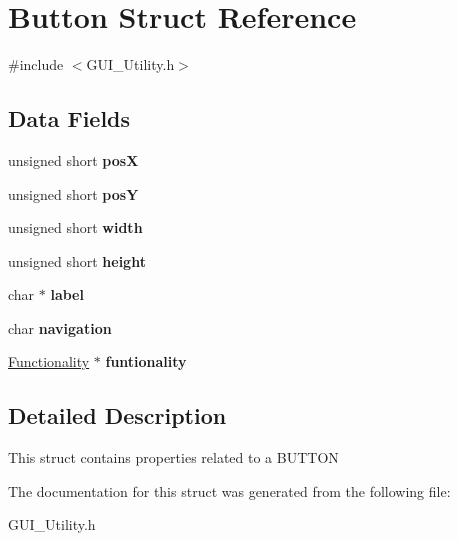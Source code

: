 \hypertarget{struct_button}{}\section{Button Struct Reference}
\label{struct_button}


{\ttfamily \#include $<$G\+U\+I\+\_\+\+Utility.\+h$>$}

\subsection*{Data Fields}
\begin{DoxyCompactItemize}
\item 
\mbox{\label{struct_button_ae290d3ad12ce8b398ffdfc89d1c34e1d}} 
unsigned short {\bfseries posX}
\item 
\mbox{\label{struct_button_a421cecbe933a4ce91c40fceb46597272}} 
unsigned short {\bfseries posY}
\item 
\mbox{\label{struct_button_a5000fda6fa2a1c60bd5af1069d98e8d1}} 
unsigned short {\bfseries width}
\item 
\mbox{\label{struct_button_a4175d3beae663f9a87db1eb6c3b3dc05}} 
unsigned short {\bfseries height}
\item 
\mbox{\label{struct_button_a7ada24b56301b270783bca5a059d2b2d}} 
char $\ast$ {\bfseries label}
\item 
\mbox{\label{struct_button_a47d50a692814f10b0b2adcc62e196576}} 
char {\bfseries navigation}
\item 
\mbox{\label{struct_button_a108f14424ddfbcc330905a612029a54d}} 
\mbox{\hyperlink{struct_functionality}{Functionality}} $\ast$ {\bfseries funtionality}
\end{DoxyCompactItemize}


\subsection{Detailed Description}
This struct contains properties related to a B\+U\+T\+T\+ON 

The documentation for this struct was generated from the following file\+:\begin{DoxyCompactItemize}
\item 
G\+U\+I\+\_\+\+Utility.\+h\end{DoxyCompactItemize}
